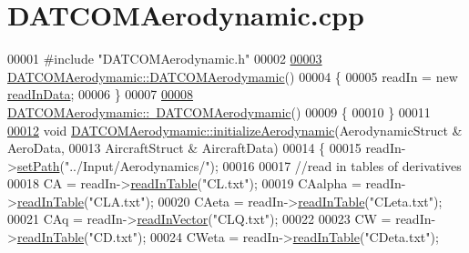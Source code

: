 \hypertarget{_d_a_t_c_o_m_aerodynamic_8cpp_source}{}\section{D\+A\+T\+C\+O\+M\+Aerodynamic.\+cpp}
\label{_d_a_t_c_o_m_aerodynamic_8cpp_source}

\begin{DoxyCode}
00001 \textcolor{preprocessor}{#include "DATCOMAerodynamic.h"}
00002 
\hyperlink{group___aerodynamic_a03d01a72cf389483e03e2bf6cce33299}{00003} \hyperlink{group___aerodynamic_a03d01a72cf389483e03e2bf6cce33299}{DATCOMAerodymamic::DATCOMAerodymamic}()
00004 \{
00005     readIn = \textcolor{keyword}{new} \hyperlink{classread_in_data}{readInData};
00006 \}
00007 
\hyperlink{group___aerodynamic_a3619e38867cad4b0c8b06a939281a74e}{00008} \hyperlink{group___aerodynamic_a3619e38867cad4b0c8b06a939281a74e}{DATCOMAerodymamic::~DATCOMAerodymamic}()
00009 \{
00010 \}
00011 
\hyperlink{group___aerodynamic_ae739c87d390f0ae0a293985478ff5d72}{00012} \textcolor{keywordtype}{void} \hyperlink{group___aerodynamic_ae739c87d390f0ae0a293985478ff5d72}{DATCOMAerodymamic::initializeAerodynamic}(AerodynamicStruct & 
      AeroData,
00013                                               AircraftStruct & AircraftData)
00014 \{
00015     readIn->\hyperlink{classread_in_data_ad67d566fd837f6d721db279144d484e0}{setPath}(\textcolor{stringliteral}{"../Input/Aerodynamics/"});
00016 
00017     \textcolor{comment}{//read in tables of derivatives}
00018     CA      = readIn->\hyperlink{classread_in_data_af616573832efc2c27f07f5f6877b1386}{readInTable}(\textcolor{stringliteral}{"CL.txt"});
00019     CAalpha = readIn->\hyperlink{classread_in_data_af616573832efc2c27f07f5f6877b1386}{readInTable}(\textcolor{stringliteral}{"CLA.txt"});
00020     CAeta   = readIn->\hyperlink{classread_in_data_af616573832efc2c27f07f5f6877b1386}{readInTable}(\textcolor{stringliteral}{"CLeta.txt"});
00021     CAq     = readIn->\hyperlink{classread_in_data_ab57aff38529234593d786ecace301cf7}{readInVector}(\textcolor{stringliteral}{"CLQ.txt"});
00022 
00023     CW      = readIn->\hyperlink{classread_in_data_af616573832efc2c27f07f5f6877b1386}{readInTable}(\textcolor{stringliteral}{"CD.txt"});
00024     CWeta   = readIn->\hyperlink{classread_in_data_af616573832efc2c27f07f5f6877b1386}{readInTable}(\textcolor{stringliteral}{"CDeta.txt"});

\end{DoxyCode}
